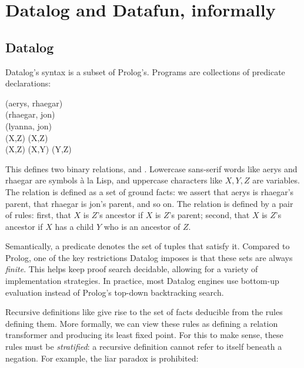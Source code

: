 \section{Datalog and Datafun, informally}
\label{sec:datalog-and-datafun}

\subsection{Datalog}
\label{sec:datalog}

Datalog's syntax is a subset of Prolog's. Programs are collections of predicate
declarations:

\newcommand\datum[1]{\textsf{#1}}

\begin{code}
  (\datum{aerys}, \datum{rhaegar})\\
  (\datum{rhaegar}, \datum{jon})\\
  (\datum{lyanna}, \datum{jon})
  \\[6pt]
  (X,Z) \gets {}(X,Z)\\
  (X,Z) \gets {}(X,Y) \wedge {}(Y,Z)
\end{code}

\noindent
This defines two binary relations,  and . Lowercase
sans-serif words like \datum{aerys} and \datum{rhaegar} are symbols \`a la
Lisp, and uppercase characters like $X,Y,Z$ are variables.
%
The  relation is defined as a set of ground facts: we assert that
\datum{aerys} is \datum{rhaegar}'s parent, that \datum{rhaegar} is \datum{jon}'s
parent, and so on. The  relation is defined by a pair of rules:
first, that $X$ is $Z$'s ancestor if $X$ is $Z$'s parent; second, that $X$ is
$Z$'s ancestor if $X$ has a child $Y$ who is an ancestor of $Z$.

Semantically, a predicate denotes the set of tuples that satisfy it. Compared to
Prolog, one of the key restrictions Datalog imposes is that these sets are
always \emph{finite}. This helps keep proof search decidable, allowing for a
variety of implementation strategies. In practice, most Datalog engines use
bottom-up evaluation instead of Prolog's top-down backtracking search.

Recursive definitions like  give rise to the set of facts
deducible from the rules defining them. More formally, we can view these rules
as defining a relation transformer and producing its least fixed point. For this
to make sense, these rules must be \emph{stratified}: a recursive definition
cannot refer to itself beneath a negation. For example, the liar paradox is
prohibited:

